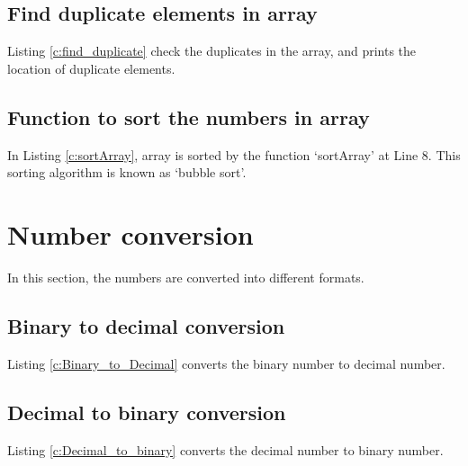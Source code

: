 \subsection{Find duplicate elements in array}
Listing \ref{c:find_duplicate} check the duplicates in the array, and prints the location of duplicate elements. 



\subsection{Function to sort the numbers in array}
In Listing \ref{c:sortArray}, array is sorted by the function `sortArray' at Line 8. This sorting algorithm is known as `bubble sort'. 




\section{Number conversion}
In this section, the numbers are converted into different formats. 
\subsection{Binary to decimal conversion}
Listing \ref{c:Binary_to_Decimal} converts the binary number to decimal number. 


\subsection{Decimal to binary conversion}
Listing \ref{c:Decimal_to_binary} converts the decimal number to binary number. 


